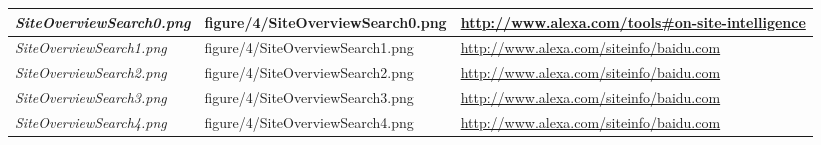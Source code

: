 \begin{longtable}{| p{4.15cm} | p{5cm} | p{6.5cm} |}
\hline
\textit{SiteOverviewSearch0.png} & figure/4/SiteOverviewSearch0.png & \url{http://www.alexa.com/tools#on-site-intelligence} \\
\hline
\textit{SiteOverviewSearch1.png} & figure/4/SiteOverviewSearch1.png & \url{http://www.alexa.com/siteinfo/baidu.com} \\
\hline
\textit{SiteOverviewSearch2.png} & figure/4/SiteOverviewSearch2.png & \url{http://www.alexa.com/siteinfo/baidu.com} \\
\hline
\textit{SiteOverviewSearch3.png} & figure/4/SiteOverviewSearch3.png & \url{http://www.alexa.com/siteinfo/baidu.com} \\
\hline
\textit{SiteOverviewSearch4.png} & figure/4/SiteOverviewSearch4.png & \url{http://www.alexa.com/siteinfo/baidu.com} \\
\hline
\hline
\end{longtable}